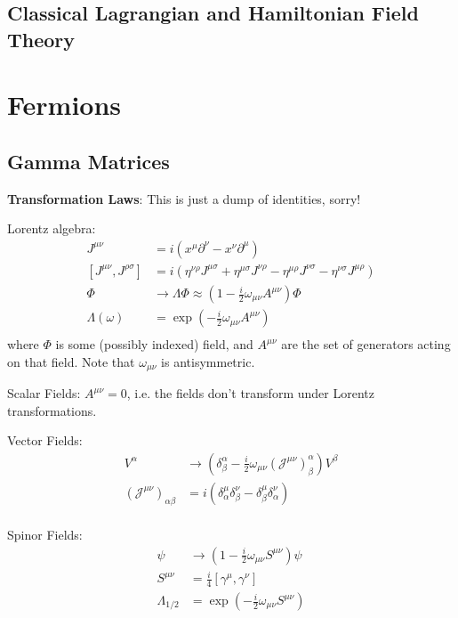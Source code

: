 \documentclass[12pt]{article}
\theoremstyle{definition}
\begin{document}
\subsection{Classical Lagrangian and Hamiltonian Field Theory}

\section{Fermions}

\subsection{Gamma Matrices}

\textbf{Transformation Laws}: This is just a dump of identities, sorry!

Lorentz algebra:
\begin{equation*}
\begin{split}
    J^{\mu\nu} &= i \left( x^\mu \partial^\nu - x^\nu \partial^\mu \right) \\
    [J^{\mu\nu}, J^{\rho\sigma}] &= i(\eta^{\nu\rho} J^{\mu\sigma} + \eta^{\mu\sigma} J^{\nu\rho} - \eta^{\mu\rho} J^{\nu\sigma} - \eta^{\nu\sigma} J^{\mu\rho}) \\
    \Phi &\to \Lambda \Phi \approx (1 - \frac{i}{2} \omega_{\mu\nu} A^{\mu\nu} ) \Phi \\
    \Lambda(\omega) &= \exp\left( -\frac{i}{2} \omega_{\mu\nu} A^{\mu\nu} \right)  \\
\end{split}
\end{equation*}
where $\Phi$ is some (possibly indexed) field, and $A^{\mu\nu}$ are the set of generators acting on that
field. Note that $\omega_{\mu\nu}$ is antisymmetric.

Scalar Fields: $A^{\mu\nu} = 0$, i.e. the fields don't transform under Lorentz transformations.

Vector Fields:
\begin{equation*}
\begin{split}
    V^\alpha &\to (\delta^{\alpha}_{\beta} - \frac{i}{2} \omega_{\mu\nu} (\mathcal{J}^{\mu\nu})^\alpha_\beta) V^\beta \\
    (\mathcal{J}^{\mu\nu})_{\alpha\beta} &= i \left( \delta^\mu_\alpha \delta^\nu_\beta - \delta^\mu_\beta \delta^\nu_\alpha \right) \\
\end{split}
\end{equation*}

Spinor Fields:
\begin{equation*}
\begin{split}
    \psi &\to (1 - \frac{i}{2} \omega_{\mu\nu} S^{\mu\nu}) \psi \\
    S^{\mu\nu} &= \frac{i}{4} [\gamma^\mu, \gamma^\nu] \\
    \Lambda_{1/2} &= \exp\left( -\frac{i}{2} \omega_{\mu\nu} S^{\mu\nu} \right) \\
\end{split}
\end{equation*}
\end{document}
